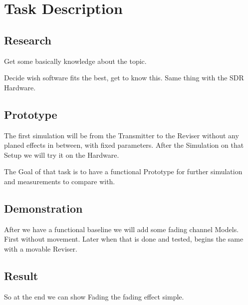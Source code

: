 \documentclass[a4paper, twosided, 11pt]{scrartcl}
\begin{document}
\section{Task Description}

\subsection{Research}
Get some basically knowledge about the topic.

Decide wish software fits the best, get to know this.
Same thing with the SDR Hardware.

\subsection{Prototype}
The first simulation will be from the Transmitter to the Reviser without any planed effects in between, with fixed parameters. After the Simulation on that Setup we will try it on the Hardware.

The Goal of that task is to have a functional Prototype for further simulation and measurements to compare with. 

\subsection{Demonstration}
After we have a functional baseline we will add some fading channel Models.
First without movement. Later when that is done and tested, begins the same with a movable Reviser.

\subsection{Result}

So at the end we can show Fading the fading effect simple. 

	  
\end{document}
